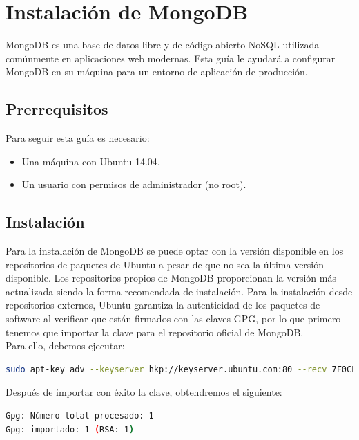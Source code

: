 \section{Instalación de MongoDB}

MongoDB es una base de datos libre y de código abierto NoSQL utilizada comúnmente en aplicaciones web modernas. Esta guía le ayudará a configurar MongoDB en su máquina para un entorno de aplicación de producción.\\

\subsection{Prerrequisitos}

Para seguir esta guía es necesario:
\begin{itemize}

\item{Una máquina con Ubuntu 14.04.}
\item{Un usuario con permisos de administrador (no root).}
\end{itemize}

\subsection{Instalación}


Para la instalación de MongoDB se puede optar con la versión disponible en los repositorios de paquetes de Ubuntu a pesar de que no sea la última versión disponible. Los repositorios propios de MongoDB proporcionan
la versión más actualizada siendo la forma recomendada de instalación. Para la instalación desde repositorios externos, Ubuntu garantiza la autenticidad de los paquetes de software al verificar que están firmados
con las claves GPG, por lo que primero tenemos que importar la clave para el repositorio oficial de MongoDB.\\

Para ello, debemos ejecutar:\\

\begin{lstlisting}[language=bash]
sudo apt-key adv --keyserver hkp://keyserver.ubuntu.com:80 --recv 7F0CEB10
\end{lstlisting}


Después de importar con éxito la clave, obtendremos el siguiente:\\

\begin{lstlisting}[language=bash]
Gpg: Número total procesado: 1
Gpg: importado: 1 (RSA: 1)
\end{lstlisting}

